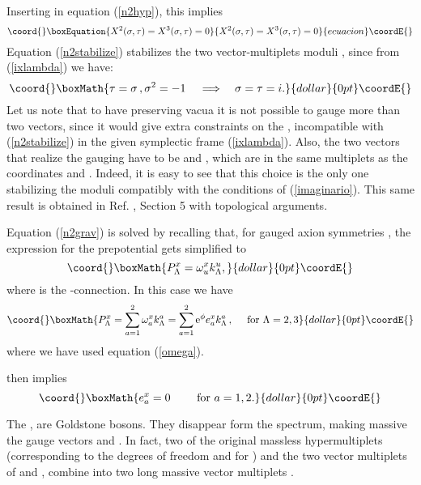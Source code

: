 \documentclass[a4paper,12pt]{article}
\begin{document}
  Inserting in equation
(\ref{n2hyp}), this implies
\begin{equation}\coord{}\boxEquation{
X^2(\sigma,\tau ) = X^3(\sigma,\tau )=0\label{n2stabilize}
}{
X^2(\sigma,\tau ) = X^3(\sigma,\tau )=0}{ecuacion}\coordE{}\end{equation}
Equation (\ref{n2stabilize}) stabilizes the two vector-multiplets
moduli \myHighlight{$(\sigma,\tau)$}\coordHE{}, since from (\ref{ixlambda}) we have:
$$\coord{}\boxMath{\tau =\sigma \, , \sigma^2 =-1 \,\quad \Longrightarrow \quad \sigma=\tau
=i.}{dollar}{0pt}\coordE{}$$ Let us note that to have \coordHE{} preserving vacua it is not
possible to gauge more than two vectors, since it would give extra
constraints on the \coordHE{}, incompatible with
(\ref{n2stabilize}) in the given symplectic frame
(\ref{ixlambda}). Also, the two vectors that realize the gauging
have to be \coordHE{} and \coordHE{}, which are in the same
multiplets as the coordinates \myHighlight{$\sigma$}\coordHE{} and \myHighlight{$\tau$}\coordHE{}. Indeed, it is
easy to see that this choice is the only one stabilizing the
moduli compatibly with the conditions \coordHE{}
of (\ref{imaginario}). This same result is obtained in Ref.
\cite{tt}, Section 5 with topological arguments.

 Equation (\ref{n2grav}) is solved by
recalling that, for gauged axion symmetries \cite{mi,da}, the
expression for the prepotential \coordHE{} gets simplified to
$$\coord{}\boxMath{P^x_\Lambda = \omega^x_u k^u_\Lambda ,}{dollar}{0pt}\coordE{}$$
where \coordHE{} is the \coordHE{}-connection. In this case we
have
$$\coord{}\boxMath{P^x_\Lambda = \sum_{a=1}^2\omega^x_a k^a_\Lambda =
\sum_{a=1}^2\mathrm{e}^\phi e^x_a k^a_\Lambda\,, \quad\mbox{ for }
\Lambda=2,3}{dollar}{0pt}\coordE{}$$ where we have used equation (\ref{omega}).

\coordHE{} then implies
$$\coord{}\boxMath{e^x_a =0\qquad \mbox{ for } a=1,2.}{dollar}{0pt}\coordE{}$$

The \coordHE{}, \coordHE{} are Goldstone bosons. They disappear form the
spectrum, making massive the gauge vectors \coordHE{} and \coordHE{}. In
fact,  two of the original massless hypermultiplets (corresponding
to the degrees of freedom \coordHE{} and \coordHE{} for \coordHE{}) and the
two  vector multiplets of \coordHE{} and \coordHE{}, combine into two long
massive vector multiplets \myHighlight{$[1,4(\frac 1 2), 5(0)]$}\coordHE{}.
\end{document}
